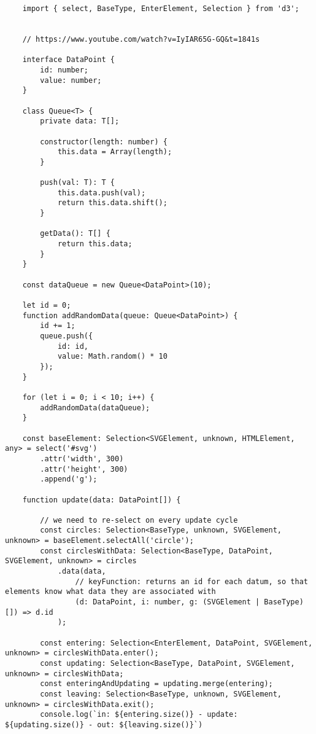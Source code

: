 \begin{lstlisting}
    import { select, BaseType, EnterElement, Selection } from 'd3';


    // https://www.youtube.com/watch?v=IyIAR65G-GQ&t=1841s 
    
    interface DataPoint {
        id: number;
        value: number;
    }
    
    class Queue<T> {
        private data: T[];
        
        constructor(length: number) {
            this.data = Array(length);
        }
    
        push(val: T): T {
            this.data.push(val);
            return this.data.shift();
        }
    
        getData(): T[] {
            return this.data;
        }
    }
    
    const dataQueue = new Queue<DataPoint>(10);
    
    let id = 0;
    function addRandomData(queue: Queue<DataPoint>) {
        id += 1;
        queue.push({
            id: id,
            value: Math.random() * 10
        });
    }
    
    for (let i = 0; i < 10; i++) {
        addRandomData(dataQueue);
    }
    
    const baseElement: Selection<SVGElement, unknown, HTMLElement, any> = select('#svg')
        .attr('width', 300)
        .attr('height', 300)
        .append('g');
        
    function update(data: DataPoint[]) {
        
        // we need to re-select on every update cycle
        const circles: Selection<BaseType, unknown, SVGElement, unknown> = baseElement.selectAll('circle');
        const circlesWithData: Selection<BaseType, DataPoint, SVGElement, unknown> = circles
            .data(data, 
                // keyFunction: returns an id for each datum, so that elements know what data they are associated with
                (d: DataPoint, i: number, g: (SVGElement | BaseType)[]) => d.id
            );
        
        const entering: Selection<EnterElement, DataPoint, SVGElement, unknown> = circlesWithData.enter();
        const updating: Selection<BaseType, DataPoint, SVGElement, unknown> = circlesWithData;
        const enteringAndUpdating = updating.merge(entering);
        const leaving: Selection<BaseType, unknown, SVGElement, unknown> = circlesWithData.exit();
        console.log(`in: ${entering.size()} - update: ${updating.size()} - out: ${leaving.size()}`)
        

\end{lstlisting}
